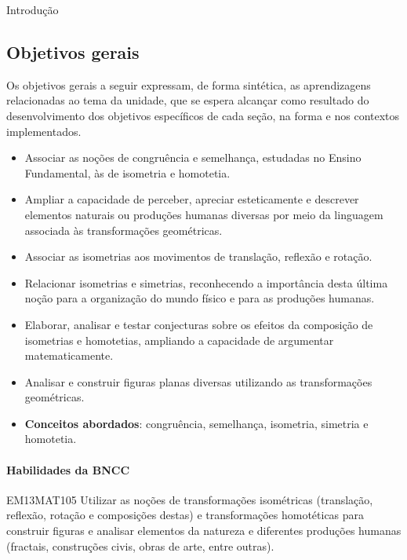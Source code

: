 \begin{apresentacao}{Introdução}
\subsection{Objetivos gerais}

Os objetivos gerais a seguir expressam, de forma sintética, as aprendizagens relacionadas ao tema da unidade, que se espera alcançar como resultado do desenvolvimento dos objetivos específicos de cada seção, na forma e nos contextos implementados. 
\begin{itemize}
\item Associar as noções de congruência e semelhança, estudadas no Ensino Fundamental, às de isometria e homotetia.
\item Ampliar a capacidade de perceber, apreciar esteticamente e descrever elementos naturais ou produções humanas diversas por meio da linguagem associada às transformações geométricas.
\item Associar as isometrias aos movimentos de translação, reflexão e rotação. 
\item Relacionar isometrias e simetrias, reconhecendo a importância desta última noção para a organização do mundo físico e para as produções humanas.
\item Elaborar, analisar e testar conjecturas sobre os efeitos da composição de isometrias e homotetias, ampliando a capacidade de argumentar matematicamente. 
\item Analisar e construir figuras planas diversas utilizando as transformações geométricas.
\item \textbf{Conceitos abordados}: congruência, semelhança, isometria, simetria e homotetia.
\end{itemize}

\paragraph{Habilidades da BNCC}
\begin{habilities}{EM13MAT105}
Utilizar as noções de transformações isométricas (translação, reflexão, rotação e composições destas) e transformações homotéticas para construir figuras e analisar elementos da natureza e diferentes produções humanas (fractais, construções civis, obras de arte, entre outras).
\end{habilities}




\end{apresentacao}
